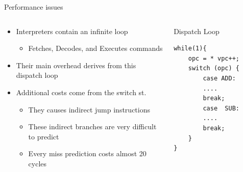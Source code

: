 \documentclass[10pt]{beamer}
\begin{document}
\begin{frame}[fragile]{Performance issues}
    \begin{columns}[T] %
        \begin{column}{.65\textwidth}
            \begin{center}
                \begin{itemize}
                    \item {Interpreters contain an infinite loop}
                        \begin{itemize}
                            \item {Fetches, Decodes, and Executes commands}
                        \end{itemize}
                    \item {Their main overhead derives from this dispatch loop}
                    \item {Additional costs come from the switch st.}
                        \begin{itemize}
                            \item {They causes indirect jump instructions}
                            \item {These indirect branches are very difficult to predict}
                            \item {Every miss prediction costs almost 20 cycles}
                        \end{itemize}
                \end{itemize}
            \end{center}
        \end{column}%
            \hfill%
            \begin{column}{.35\textwidth}
                \begin{alertblock}{Dispatch Loop}
                    \begin{center}
                        \begin{lstlisting}[basicstyle=\footnotesize , breaklines]
while(1){
    opc = * vpc++;
    switch (opc) {
        case ADD:
        ....
        break;
        case  SUB:
        ....				
        break;
    }	
}
                        \end{lstlisting}
                    \end{center}
                \end{alertblock}
            \end{column}%
    \end{columns}
\end{frame}
\end{document}
